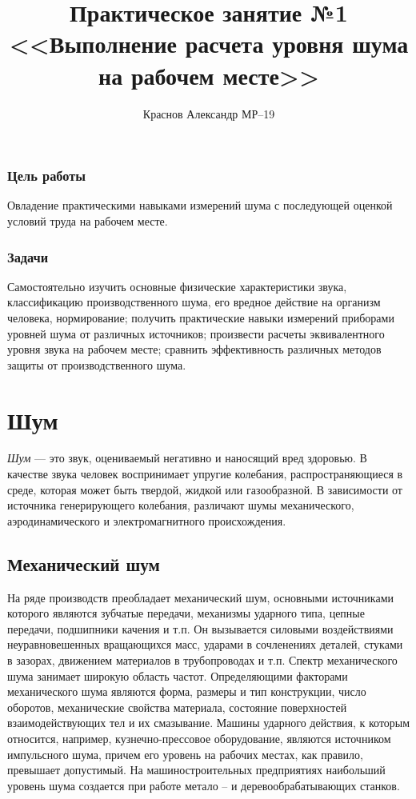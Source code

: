 \documentclass[a5paper, 12dd, twoside]{article}
\title{Практическое занятие №1\\<<Выполнение расчета уровня шума на рабочем месте>>}
\author{Краснов Александр МР--19}
\begin{document}
\maketitle
\tableofcontents
\clearpage

\subsubsection*{Цель работы}
Овладение практическими навыками измерений шума с пос\-ле\-ду\-ю\-щей оценкой условий труда на рабочем месте.

\subsubsection*{Задачи}
Самостоятельно изучить основные физические ха\-рак\-те\-рис\-ти\-ки звука, классификацию производственного шума, его вредное действие на организм человека, нормирование; получить практические навыки измерений приборами уровней шума от различных источников; произвести расчеты эквивалентного уровня звука на рабочем месте; сравнить эффективность различных методов защиты от про\-из\-вод\-ствен\-но\-го шума.

\section{Шум}
{\itshape Шум} --- это звук, оцениваемый негативно и наносящий\- вред здоровью. 
В качестве звука человек воспринимает упругие колебания, распространяющиеся в среде, которая может быть твердой, жидкой или газообразной. В зависимости от источника генерирующего колебания, различают шумы механического, аэродинамического и электромагнитного происхождения. 

\subsection{Механический шум}
На ряде производств преобладает механический шум, основными источниками которого являются зубчатые передачи, механизмы ударного типа, цепные передачи, подшипники качения и т.п. Он вызывается силовыми воздействиями неуравновешенных вращающихся масс, ударами в сочленениях деталей, стуками в зазорах, движением материалов в трубопроводах и т.п. Спектр механического шума занимает широкую область частот. Определяющими факторами механического шума являются форма, размеры и тип конструкции, число оборотов, механические свойства материала, состояние поверхностей взаимодействующих тел и их смазывание. Машины ударного действия, к которым относится, например, кузнечно-прессовое оборудование, являются источником импульсного шума, причем его уровень на рабочих местах, как правило, превышает допустимый. На машиностроительных предприятиях наибольший уровень шума создается при работе метало -- и деревообрабатывающих станков. 
\end{document}
